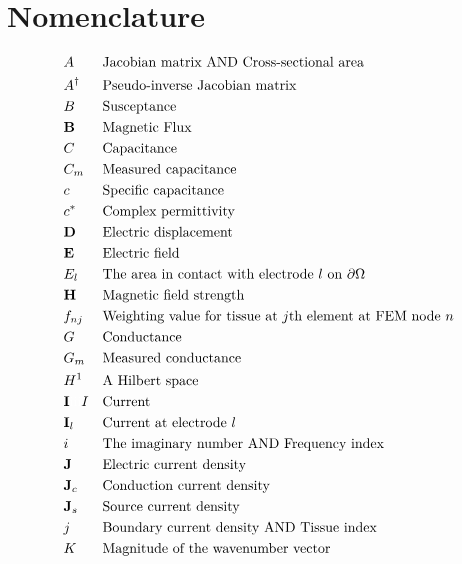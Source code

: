 
\chapter*{Nomenclature}
\begin{align*}
	&A &&\text{Jacobian matrix AND Cross-sectional area}\\
	&A^{\dagger} &&\text{Pseudo-inverse Jacobian matrix}\\
	&B &&\text{Susceptance}\\
	&\mathbf{B} &&\text{Magnetic Flux}\\
	&C &&\text{Capacitance}\\
	&C_m &&\text{Measured capacitance}\\
	&c &&\text{Specific capacitance}\\
	&c^* &&\text{Complex permittivity}\\
	&\mathbf{D} &&\text{Electric displacement}\\
	&\mathbf{E} &&\text{Electric field}\\
	&E_l &&\text{The area in contact with electrode } l \text{ on } \partial \Omega \\	
	&\mathbf{H} &&\text{Magnetic field strength}\\
	&f_{nj} &&\text{Weighting value for tissue at } j \text{th element at FEM node } n \\
	&G &&\text{Conductance}\\
	&G_m &&\text{Measured conductance}\\
	&H^1 &&\text{A Hilbert space}\\	
	&\mathbf{I} \text{\textcolor{white}{iii}} I &&\text{Current}\\	
	&\mathbf{I}_l &&\text{Current at electrode } l \\
	&i &&\text{The imaginary number AND Frequency index}\\	
	&\mathbf{J} &&\text{Electric current density}\\	
	&\mathbf{J}_c &&\text{Conduction current density}\\
	&\mathbf{J}_s &&\text{Source current density}\\	
	&j &&\text{Boundary current density AND Tissue index}\\
	&K &&\text{Magnitude of the wavenumber vector}\\
\end{align*}

